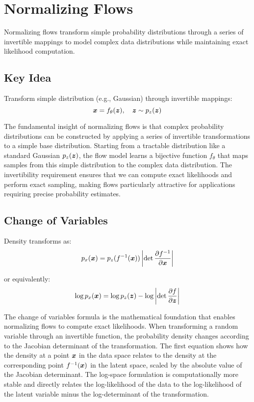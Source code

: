 
\section{Normalizing Flows }
\label{sec:normalizing-flows}

Normalizing flows transform simple probability distributions through a series of invertible mappings to model complex data distributions while maintaining exact likelihood computation.

\subsection{Key Idea}

Transform simple distribution (e.g., Gaussian) through invertible mappings:
\begin{equation}
\boldsymbol{x} = f_{\theta}(\boldsymbol{z}), \quad \boldsymbol{z} \sim p_z(\boldsymbol{z})
\end{equation}

The fundamental insight of normalizing flows is that complex probability distributions can be constructed by applying a series of invertible transformations to a simple base distribution. Starting from a tractable distribution like a standard Gaussian $p_z(\boldsymbol{z})$, the flow model learns a bijective function $f_{\theta}$ that maps samples from this simple distribution to the complex data distribution. The invertibility requirement ensures that we can compute exact likelihoods and perform exact sampling, making flows particularly attractive for applications requiring precise probability estimates.

\subsection{Change of Variables}

Density transforms as:
\begin{equation}
p_x(\boldsymbol{x}) = p_z(f^{-1}(\boldsymbol{x})) \left|\det \frac{\partial f^{-1}}{\partial \boldsymbol{x}}\right|
\end{equation}

or equivalently:
\begin{equation}
\log p_x(\boldsymbol{x}) = \log p_z(\boldsymbol{z}) - \log\left|\det \frac{\partial f}{\partial \boldsymbol{z}}\right|
\end{equation}

The change of variables formula is the mathematical foundation that enables normalizing flows to compute exact likelihoods. When transforming a random variable through an invertible function, the probability density changes according to the Jacobian determinant of the transformation. The first equation shows how the density at a point $\boldsymbol{x}$ in the data space relates to the density at the corresponding point $f^{-1}(\boldsymbol{x})$ in the latent space, scaled by the absolute value of the Jacobian determinant. The log-space formulation is computationally more stable and directly relates the log-likelihood of the data to the log-likelihood of the latent variable minus the log-determinant of the transformation.

